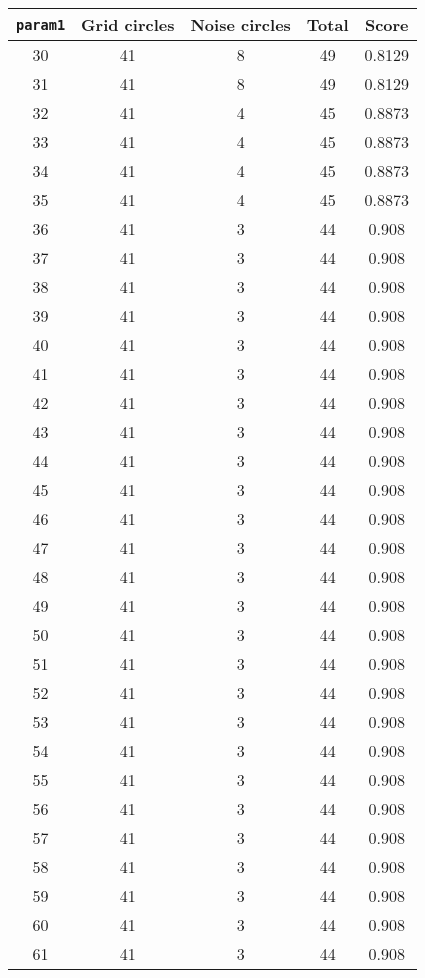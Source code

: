 \documentclass[letterpaper, 12pt]{article}
\begin{document}
\begin{longtable}{|c|c|c|c|c|}
\hline
\textbf{\texttt{param1}} & \textbf{Grid circles} & \textbf{Noise circles} & \textbf{Total} & \textbf{Score} \\
\hline
30 & 41 & 8 & 49 & 0.8129 \\
\hline
31 & 41 & 8 & 49 & 0.8129 \\
\hline
32 & 41 & 4 & 45 & 0.8873 \\
\hline
33 & 41 & 4 & 45 & 0.8873 \\
\hline
34 & 41 & 4 & 45 & 0.8873 \\
\hline
35 & 41 & 4 & 45 & 0.8873 \\
\hline
36 & 41 & 3 & 44 & 0.908 \\
\hline
37 & 41 & 3 & 44 & 0.908 \\
\hline
38 & 41 & 3 & 44 & 0.908 \\
\hline
39 & 41 & 3 & 44 & 0.908 \\
\hline
40 & 41 & 3 & 44 & 0.908 \\
\hline
41 & 41 & 3 & 44 & 0.908 \\
\hline
42 & 41 & 3 & 44 & 0.908 \\
\hline
43 & 41 & 3 & 44 & 0.908 \\
\hline
44 & 41 & 3 & 44 & 0.908 \\
\hline
45 & 41 & 3 & 44 & 0.908 \\
\hline
46 & 41 & 3 & 44 & 0.908 \\
\hline
47 & 41 & 3 & 44 & 0.908 \\
\hline
48 & 41 & 3 & 44 & 0.908 \\
\hline
49 & 41 & 3 & 44 & 0.908 \\
\hline
50 & 41 & 3 & 44 & 0.908 \\
\hline
51 & 41 & 3 & 44 & 0.908 \\
\hline
52 & 41 & 3 & 44 & 0.908 \\
\hline
53 & 41 & 3 & 44 & 0.908 \\
\hline
54 & 41 & 3 & 44 & 0.908 \\
\hline
55 & 41 & 3 & 44 & 0.908 \\
\hline
56 & 41 & 3 & 44 & 0.908 \\
\hline
57 & 41 & 3 & 44 & 0.908 \\
\hline
58 & 41 & 3 & 44 & 0.908 \\
\hline
59 & 41 & 3 & 44 & 0.908 \\
\hline
60 & 41 & 3 & 44 & 0.908 \\
\hline
61 & 41 & 3 & 44 & 0.908 \\

\end{longtable}
\end{document}
